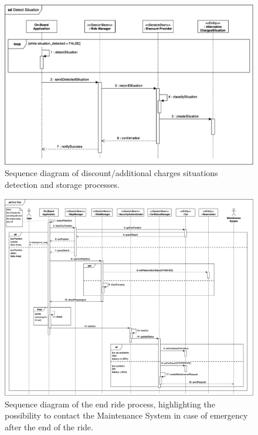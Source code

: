 \begin{figure}[H]
\begin{center}
		\includegraphics[width=\textwidth]{./arch_design/diagrams/apply_bonus_sd.png}
		\caption{Sequence diagram of discount/additional charges situations detection and storage processes.}
		\label{apply_bonus_sd}
\end{center}
\end{figure}

\begin{figure}[H]
\begin{center}
		\includegraphics[width=\textwidth]{./arch_design/diagrams/end_ride_sd.png}
		\caption{Sequence diagram of the end ride process, highlighting the possibility to contact the Maintenance System in case of emergency after the end of the ride.}
		\label{end_ride_sd}
\end{center}
\end{figure}


